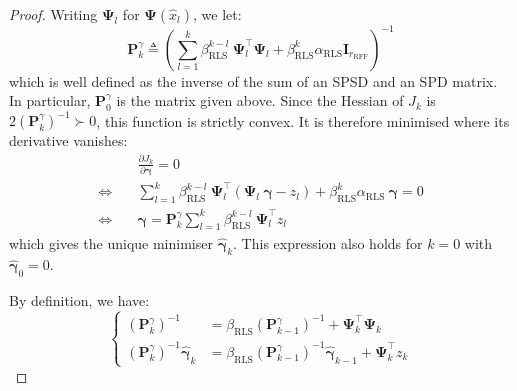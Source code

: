 \begin{proof}
	Writing $\boldsymbol{\Psi}_l$ for $\boldsymbol{\Psi}\left(\hat{x}_l\right)$, we let:
	\begin{equation}
		\mathbf{P}_k^\gamma\triangleq\left(\sum_{l=1}^k\beta_{\mathrm{RLS}}^{k-l}\:\boldsymbol{\Psi}_l^\top\boldsymbol{\Psi}_l+\beta_{\mathrm{RLS}}^k\alpha_{\mathrm{RLS}}\mathbf{I}_{r_{\mathrm{RFF}}}\right)^{-1}
	\end{equation}
	which is well defined as the inverse of the sum of an SPSD and an SPD matrix. In particular, $\mathbf{P}_0^\gamma$ is the matrix given above. Since the Hessian of $J_k$ is $2\left(\mathbf{P}_k^\gamma\right)^{-1}\succ0$, this function is strictly convex. It is therefore minimised where its derivative vanishes:
	\begin{equation}
		\begin{aligned}
		&\frac{\partial J_k}{\partial\boldsymbol{\gamma}}=0\\
		\iff\quad&\sum_{l=1}^k\beta_{\mathrm{RLS}}^{k-l}\:\boldsymbol{\Psi}_l^\top\left(\boldsymbol{\Psi}_l\:\boldsymbol{\gamma}-z_l\right)+\beta_{\mathrm{RLS}}^k\alpha_{\mathrm{RLS}}\:\boldsymbol{\gamma}=0\\
		\iff\quad&\boldsymbol{\gamma}=\mathbf{P}_k^\gamma\sum_{l=1}^k\beta_{\mathrm{RLS}}^{k-l}\:\boldsymbol{\Psi}_l^\top z_l
		\end{aligned}
	\end{equation}
	which gives the unique minimiser $\hat{\boldsymbol{\gamma}}_k$. This expression also holds for $k=0$ with $\hat{\boldsymbol{\gamma}}_0=0$.

	By definition, we have:
	\begin{equation}
		\left\{\begin{aligned}
		\left(\mathbf{P}_k^\gamma\right)^{-1}&=\beta_{\mathrm{RLS}}\left(\mathbf{P}_{k-1}^\gamma\right)^{-1}+\boldsymbol{\Psi}_k^\top\boldsymbol{\Psi}_k\\
		\left(\mathbf{P}_k^\gamma\right)^{-1}\hat{\boldsymbol{\gamma}}_k&=\beta_{\mathrm{RLS}}\left(\mathbf{P}_{k-1}^\gamma\right)^{-1}\hat{\boldsymbol{\gamma}}_{k-1}+\boldsymbol{\Psi}_k^\top z_k
		\end{aligned}\right.
	\end{equation}


\end{proof}
